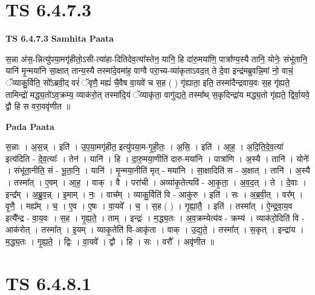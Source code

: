 \documentclass[17pt]{extarticle}
\begin{document}
\section*{ TS 6.4.7.3 }

\textbf{TS 6.4.7.3 } \newline
\textbf{Samhita Paata} \newline

स॒न्ना अ॑स॒-न्नित्यु॑पया॒मगृ॑हीतो॒ऽसी-त्या॑हा-दितिदेव॒त्या᳚स्तेन॒ यानि॒ हि दा॑रु॒मया॑णि॒ पात्रा᳚ण्य॒स्यै तानि॒ योनेः॒ संभू॑तानि॒ यानि॑ मृ॒न्मया॑नि सा॒क्षात् तान्य॒स्यै तस्मा॑दे॒वमा॑ह॒ वाग्वै परा॒च्य-व्या॑कृताऽवद॒त् ते दे॒वा इन्द्र॑मब्रुवन्नि॒मां नो॒ वाचं॒ ॅव्याकु॒र्विति॒ सो᳚ऽब्रवी॒द् वरं॑ ॅवृणै॒ मह्यं॑ चै॒वैष वा॒यवे॑ च स॒ह ( ) गृ॑ह्याता॒ इति॒ तस्मा॑दैन्द्रवाय॒वः स॒ह गृ॑ह्यते॒ तामिन्द्रो॑ मद्ध्य॒तो॑ऽव॒क्रम्य॒ व्याक॑रो॒त् तस्मा॑दि॒यं ॅव्याकृ॑ता॒ वागु॑द्यते॒ तस्मा᳚थ् स॒कृदिन्द्रा॑य मद्ध्य॒तो गृ॑ह्यते॒ द्विर्वा॒यवे॒ द्वौ हि स वरा॒ववृ॑णीत ॥ \newline

\textbf{Pada Paata} \newline

स॒न्नाः । अ॒स॒न्न् । इति॑ । उ॒प॒या॒मगृ॑हीत॒ इत्यु॑पया॒म-गृ॒ही॒तः॒ । अ॒सि॒ । इति॑ । आ॒ह॒ । अ॒दि॒ति॒दे॒व॒त्या॑ इत्य॑दिति - दे॒व॒त्याः᳚ । तेन॑ । यानि॑ । हि । दा॒रु॒मया॒णीति॑ दारु-मया॑नि । पात्रा॑णि । अ॒स्यै । तानि॑ । योनेः᳚ । संभू॑ता॒नीति॒ सं - भू॒ता॒नि॒ । यानि॑ । मृ॒न्मया॒नीति॑ मृत् - मया॑नि । सा॒क्षादिति॑ स - अ॒क्षात् । तानि॑ । अ॒स्यै । तस्मा᳚त् । ए॒वम् । आ॒ह॒ । वाक् । वै । परा॑ची । अव्या॑कृ॒तेत्यवि॑ - आ॒कृ॒ता॒ । अ॒व॒द॒त् । ते । दे॒वाः । इन्द्र᳚म् । अ॒ब्रु॒व॒न्न् । इ॒माम् । नः॒ । वाच᳚म् । व्याकु॒र्विति॑ वि - आकु॑रु । इति॑ । सः । अ॒ब्र॒वी॒त् । वर᳚म् । वृ॒णै॒ । मह्य᳚म् । च॒ । ए॒व । ए॒षः । वा॒यवे᳚ । च॒ । स॒ह ( ) । गृ॒ह्या॒तै॒ । इति॑ । तस्मा᳚त् । ऐ॒न्द्र॒वा॒य॒व इत्यै᳚न्द्र - वा॒य॒वः । स॒ह । गृ॒ह्य॒ते॒ । ताम् । इन्द्रः॑ । म॒द्ध्य॒तः । अ॒व॒क्रम्येत्य॑व - क्रम्य॑ । व्याक॑रो॒दिति॑ वि - आक॑रोत् । तस्मा᳚त् । इ॒यम् । व्याकृ॒तेति॑ वि-आकृ॑ता । वाक् । उ॒द्य॒ते॒ । तस्मा᳚त् । स॒कृत् । इन्द्रा॑य । म॒द्ध्य॒तः । गृ॒ह्य॒ते॒ । द्विः । वा॒यवे᳚ । द्वौ । हि । सः । वरौ᳚ । अवृ॑णीत ॥  \newline




\section*{ TS 6.4.8.1 }
\end{document}
